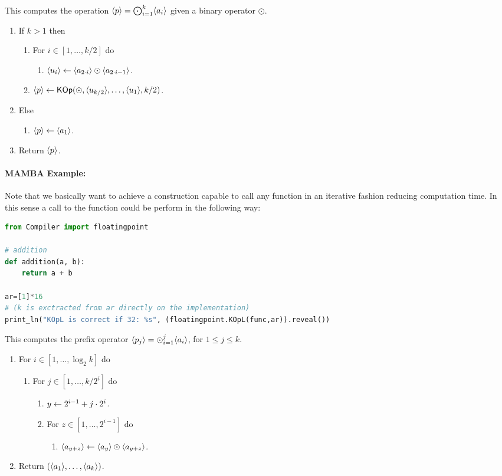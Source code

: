 This computes the operation $\langle p \rangle= \bigodot_{i=1}^k \langle a_i \rangle$
given a binary operator $\odot$.
\begin{enumerate}
\item If $k>1$ then
\begin{enumerate}
  \item For $i \in [1,\ldots,k/2]$ do
  \begin{enumerate}
     \item $\langle u_i \rangle \leftarrow \langle a_{2\cdot i} \rangle \odot \langle a_{2 \cdot i-1} \rangle$.
  \end{enumerate}
  \item $\langle p \rangle \leftarrow \mathsf{KOp}(\odot, \langle u_{k/2} \rangle,\ldots,\langle u_1 \rangle,k/2)$.
\end{enumerate}
\item Else
\begin{enumerate}
   \item $\langle p \rangle \leftarrow \langle a_1 \rangle$.
\end{enumerate}
\item Return $\langle p \rangle$.
\end{enumerate}

\paragraph{MAMBA Example:} Note that we basically want to achieve a construction capable to call any function in an iterative fashion reducing computation time. In this sense a call to the function could be perform in the following way: 
\begin{lstlisting}[language={python}]
from Compiler import floatingpoint

# addition
def addition(a, b):
    return a + b
    
ar=[1]*16
# (k is exctracted from ar directly on the implementation)
print_ln("KOpL is correct if 32: %s", (floatingpoint.KOpL(func,ar)).reveal())
\end{lstlisting}

This computes the prefix operator $\langle p_j \rangle = \odot_{i=1}^j \langle a_i \rangle$,
for $1 \le j \le k$.
\begin{enumerate}
\item For $i \in [1,\ldots, \log_2 k]$ do
\begin{enumerate}
  \item For $j \in [1,\ldots,k/2^i]$ do
  \begin{enumerate}
     \item $y \leftarrow 2^{i-1}+j\cdot 2^i$.
     \item For $z \in [1,\ldots,2^{i-1}]$ do
     \begin{enumerate}
	\item $\langle a_{y+z} \rangle \leftarrow \langle a_y \rangle \odot \langle a_{y+z} \rangle$.
     \end{enumerate}
  \end{enumerate}
\end{enumerate}
\item Return $(\langle a_1 \rangle,\ldots,\langle a_k \rangle)$.
\end{enumerate}

